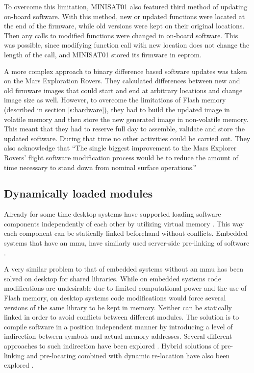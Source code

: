 To overcome this limitation, MINISAT01 also featured third method of updating on-board software. With this method, new or updated functions were located at the end of the firmware, while old versions were kept on their original locations. Then any calls to modified functions were changed in on-board software. This was possible, since modifying function call with new location does not change the length of the call, and MINISAT01 stored its firmware in \gls{eeprom}. \cite{Garrido1998}

A more complex approach to binary difference based software updates was taken on the Mars Exploration Rovers. They calculated differences between new and old firmware images that could start and end at arbitrary locations and change image size as well. However, to overcome the limitations of Flash memory (described in section \ref{s:hardware}), they had to build the updated image in volatile memory and then store the new generated image in non-volatile memory. This meant that they had to reserve full day to assemble, validate and store the updated software. During that time no other activities could be carried out. They also acknowledge that ``The single biggest improvement to the Mars Explorer Rovers' flight software modification process would be to reduce the amount of time necessary to stand down from nominal surface operations.'' \cite{Greco2005}

\subsection{Dynamically loaded modules}

Already for some time desktop systems have supported loading software components independently of each other by utilizing virtual memory \cite{Kilburn1962}. This way each component can be statically linked beforehand without conflicts. Embedded systems that have an \gls{mmu}, have similarly used server-side pre-linking of software \cite{Shen2010}.

A very similar problem to that of embedded systems without an \gls{mmu} has been solved on desktop for shared libraries. While on embedded systems code modifications are undesirable due to limited computational power and the use of Flash memory, on desktop systems code modifications would force several versions of the same library to be kept in memory. Neither can be statically linked in order to avoid conflicts between different modules. The solution is to compile software in a position independent manner by introducing a level of indirection between symbols and actual memory addresses. Several different approaches to such indirection have been explored \cite[Chapter~8]{Levine1999}. Hybrid solutions of pre-linking and pre-locating combined with dynamic re-location have also been explored \cite{Dong2009}.

